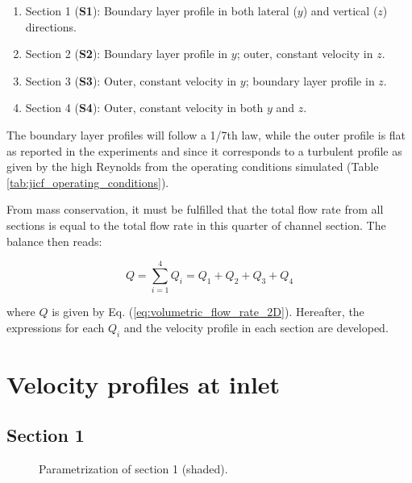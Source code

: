 \begin{enumerate}

	\item Section 1 (\textbf{S1}): Boundary layer profile in both lateral ($y$) and vertical ($z$) directions.
	
	\item Section 2 (\textbf{S2}): Boundary layer profile in $y$; outer, constant velocity in $z$.
	
	\item Section 3 (\textbf{S3}): Outer, constant velocity in $y$; boundary layer profile in $z$.
	
	\item Section 4 (\textbf{S4}): Outer, constant velocity in both $y$ and $z$.

\end{enumerate}
	
The boundary layer profiles will follow a 1/7th law, while the outer profile is flat as reported in the experiments  and since it corresponds to a turbulent profile as given by the high Reynolds from the operating conditions simulated (Table \ref{tab:jicf_operating_conditions}). 

From mass conservation, it must be fulfilled that the total flow rate from all sections is equal to the total flow rate in this quarter of channel section. The balance then reads:

\begin{equation}
\label{eq:3D_BL_Qconservation}
Q = \sum_{i=1}^4 Q_i = Q_1 + Q_2 + Q_3 + Q_4
\end{equation}

where $Q$ is given by Eq. (\ref{eq:volumetric_flow_rate_2D}). Hereafter, the expressions for each $Q_i$ and the velocity profile in each section are developed.

\section*{Velocity profiles at inlet}

\subsection*{Section 1}

\begin{figure}[h!]	
	\centering
%	
	\caption{Parametrization of section 1 (shaded).}
	\label{fig:param_S1}
\end{figure}

